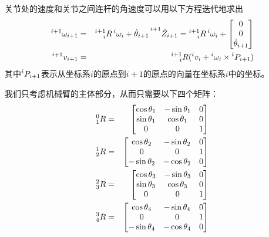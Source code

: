 \documentclass{ctexart}
\begin{document}
关节处的速度和关节之间连杆的角速度可以用以下方程迭代地求出
\begin{eqnarray*}
    \prescript{i+1}{}{\omega_{i+1}} 
    &=& \prescript{i+1}{i}{R} \prescript{i}{}{\omega_i} + \dot \theta_{i+1} \prescript{i+1}{}{\hat Z_{i+1}} 
    = \prescript{i+1}{i}{R} \prescript{i}{}{\omega_i} + \begin{bmatrix}
        0 \\ 0 \\ \dot \theta_{i+1}
    \end{bmatrix}\\
    \prescript{i+1}{}{v_{i+1}} 
    &=& \prescript{i+1}{i}{R} (\prescript{i}{}{v_i} + \prescript{i}{ }{\omega_i} \times \prescript{i}{}{P_{i+1}})
\end{eqnarray*}
其中$\prescript{i}{}{P_{i+1}}$表示从坐标系$i$的原点到$i+1$的原点的向量在坐标系$i$中的坐标。

我们只考虑机械臂的主体部分，从而只需要以下四个矩阵：
\begin{eqnarray*}
    \prescript{0}{1}{R} &=&
    \begin{bmatrix}
        \cos \theta_1 & - \sin \theta_1 & 0  \\
        \sin \theta_1 & \cos \theta_1 & 0  \\
        0 & 0 & 1  \\
    \end{bmatrix} \\
    \prescript{1}{2}{R} &=&
    \begin{bmatrix}
        \cos \theta_2 & - \sin \theta_2 & 0  \\
        0 & 0 & 1 \\
        -\sin \theta_2 & - \cos \theta_2 & 0
    \end{bmatrix} \\
    \prescript{2}{3}{R} &=&
    \begin{bmatrix}
        \cos \theta_3 & - \sin \theta_3 & 0  \\
        \sin \theta_3 & \cos \theta_3 & 0 \\
        0 & 0 & 1
    \end{bmatrix} \\
    \prescript{3}{4}{R} &=&
    \begin{bmatrix}
        \cos \theta_4 & - \sin \theta_4 & 0 \\
        0 & 0 & 1 \\
        -\sin \theta_4 & - \cos \theta_4 & 0
    \end{bmatrix} \\
\end{eqnarray*}
\end{document}
